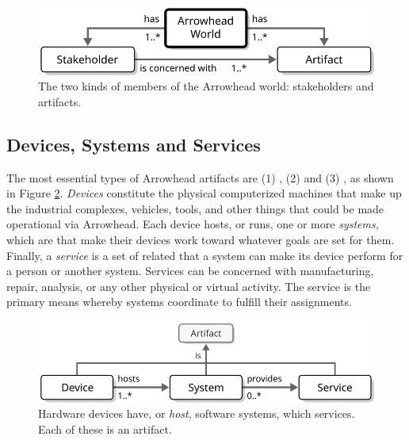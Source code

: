 \vspace*{1mm}

\begin{figure}[ht!]
  \centering
  \includegraphics[scale=0.9]{figures/world}
  \caption{
    The two kinds of members of the Arrowhead world: stakeholders and artifacts.
  }
  \label{fig:world}
\end{figure}

\vspace*{-3mm}

\subsection{Devices, Systems and Services}

The most essential types of Arrowhead artifacts are (1) , (2)  and (3) , as shown in Figure \ref{fig:device-system-service}.
\textit{Devices} constitute the physical computerized machines that make up the industrial complexes, vehicles, tools, and other things that could be made operational via Arrowhead.
Each device hosts, or runs, one or more \textit{systems}, which are   that make their devices work toward whatever goals are set for them.
Finally, a \textit{service} is a set of related  that a system can make its device perform for a person or another system.
Services can be concerned with manufacturing, repair, analysis, or any other physical or virtual activity.
The service is the primary means whereby systems coordinate to fulfill their assignments.

\vspace*{1mm}

\begin{figure}[ht!]
  \centering
  \includegraphics[scale=0.9]{figures/device-system-service}
  \caption{
    Hardware devices have, or \textit{host}, software systems, which  services.
    Each of these is an artifact.
  }
  \label{fig:device-system-service}
\end{figure}


